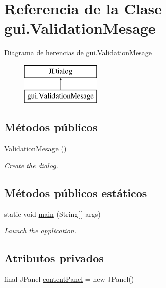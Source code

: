 \hypertarget{classgui_1_1_validation_mesage}{}\section{Referencia de la Clase gui.\+Validation\+Mesage}
\label{classgui_1_1_validation_mesage}
Diagrama de herencias de gui.\+Validation\+Mesage\begin{figure}[H]
\begin{center}
\leavevmode
\includegraphics[height=2.000000cm]{classgui_1_1_validation_mesage}
\end{center}
\end{figure}
\subsection*{Métodos públicos}
\begin{DoxyCompactItemize}
\item 
\mbox{\hyperlink{classgui_1_1_validation_mesage_a647fd86859f2d4c283aaf6ce04075179}{Validation\+Mesage}} ()
\begin{DoxyCompactList}\small\item\em Create the dialog. \end{DoxyCompactList}\end{DoxyCompactItemize}
\subsection*{Métodos públicos estáticos}
\begin{DoxyCompactItemize}
\item 
static void \mbox{\hyperlink{classgui_1_1_validation_mesage_a376d97c710f1ae16d6c7b8ebdb68fc84}{main}} (String\mbox{[}$\,$\mbox{]} args)
\begin{DoxyCompactList}\small\item\em Launch the application. \end{DoxyCompactList}\end{DoxyCompactItemize}
\subsection*{Atributos privados}
\begin{DoxyCompactItemize}
\item 
final J\+Panel \mbox{\hyperlink{classgui_1_1_validation_mesage_a6c81a55b78329c6ac3e6f31b11e5e966}{content\+Panel}} = new J\+Panel()
\end{DoxyCompactItemize}


